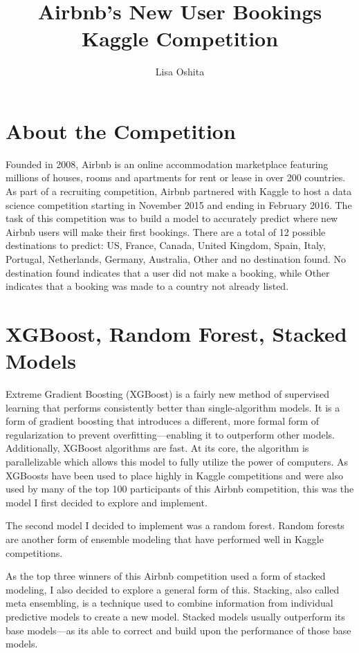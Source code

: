 \documentclass{article}
\title{Airbnb's New User Bookings Kaggle Competition}
\author{Lisa Oshita}
\begin{document}


\maketitle

\section{About the Competition}


Founded in 2008, Airbnb is an online accommodation marketplace featuring millions of houses,
rooms and apartments for rent or lease in over 200 countries. As part of a recruiting competition,
Airbnb partnered with Kaggle to host a data science competition starting in November 2015 and ending
in February 2016. The task of this competition was to build a model to accurately predict where new
Airbnb users will make their first bookings. There are a total of 12 possible destinations to predict:
US, France, Canada, United Kingdom, Spain, Italy, Portugal, Netherlands, Germany, Australia, Other and
no destination found. No destination found indicates that a user did not make a booking, while Other
indicates that a booking was made to a country not already listed. 

\section{XGBoost, Random Forest, Stacked Models}

Extreme Gradient Boosting (XGBoost) is a fairly new method of supervised learning that performs consistently 
better than single-algorithm models. It is a form of gradient boosting that introduces a different, more 
formal form of regularization to prevent overfitting---enabling it to outperform other models. Additionally, 
XGBoost algorithms are fast. At its core, the algorithm is parallelizable which allows this model to fully 
utilize the power of computers. As XGBoosts have been used to place highly in Kaggle competitions and were 
also used by many of the top 100 participants of this Airbnb competition, this was the model I first decided 
to explore and implement. 

The second model I decided to implement was a random forest. Random forests are another form of ensemble 
modeling that have performed well in Kaggle competitions. 

As the top three winners of this Airbnb competition used a form of stacked modeling, I also decided to 
explore a general form of this. Stacking, also called meta ensembling, is a technique used to combine 
information from individual predictive models to create a new model. Stacked models usually outperform 
its base models---as it\textquotesingle s able to correct and build upon the performance of those base models. 
\end{document}
